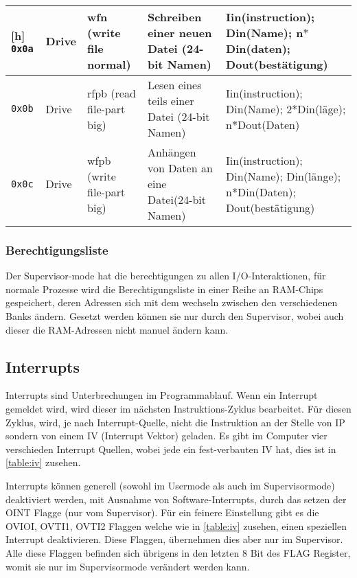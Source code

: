 \documentclass{scrartcl}
\begin{document}
\begin{center}
\begin{longtable}{p{} | p{} | p{} | p{} | p{}}[h]
			\hline
			\texttt{0x0a} & Drive & wfn (write file normal) & Schreiben einer neuen Datei (24-bit Namen) & Iin(instruction); Din(Name); n$*$Din(daten); Dout(bestätigung) \\
			\hline
			\texttt{0x0b} & Drive & rfpb (read file-part big) & Lesen eines teils einer Datei (24-bit Namen) & Iin(instruction); Din(Name); 2$*$Din(läge); n$*$Dout(Daten) \\
			\hline
			\texttt{0x0c} & Drive & wfpb (write file-part big) & Anhängen von Daten an eine Datei(24-bit Namen) & Iin(instruction); Din(Name); Din(länge); n$*$Din(Daten); Dout(bestätigung)
	\end{longtable}
\end{center}


\subsubsection{\label{section:persmissionIO}Berechtigungsliste}

Der Supervisor-mode hat die berechtigungen zu allen I/O-Interaktionen, für normale Prozesse wird die Berechtigungsliste in einer Reihe an RAM-Chips gespeichert, deren Adressen sich mit dem wechseln zwischen den verschiedenen Banks ändern.
Gesetzt werden können sie nur durch den Supervisor, wobei auch dieser die RAM-Adressen nicht manuel ändern kann.


\subsection{\label{section:interrupts}Interrupts}

Interrupts sind Unterbrechungen im Programmablauf.
Wenn ein Interrupt gemeldet wird, wird dieser im nächsten Instruktions-Zyklus bearbeitet.
Für diesen Zyklus, wird, je nach Interrupt-Quelle, nicht die Instruktion an der Stelle von IP sondern von einem IV (Interrupt Vektor) geladen.
Es gibt im Computer vier verschieden Interrupt Quellen, wobei jede ein fest-verbauten IV hat, dies ist in \autoref{table:iv} zusehen.

Interrupts können generell (sowohl im Usermode als auch im Supervisormode) deaktiviert werden, mit Ausnahme von Software-Interrupts, durch das setzen der OINT Flagge (nur vom Supervisor).
Für ein feinere Einstellung gibt es die OVIOI, OVTI1, OVTI2 Flaggen welche wie in \autoref{table:iv} zusehen, einen speziellen Interrupt deaktivieren.
Diese Flaggen, übernehmen dies aber nur im Supervisor.
Alle diese Flaggen befinden sich übrigens in den letzten 8 Bit des FLAG Register, womit sie nur im Supervisormode verändert werden kann.
\end{document}
